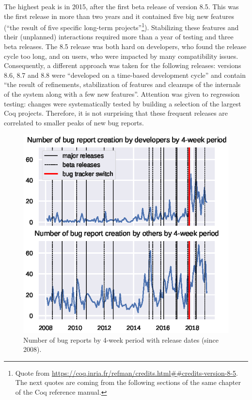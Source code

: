 \documentclass[conference]{IEEEtran}
\begin{document}
The highest peak is in 2015, after the first beta release of version 8.5. This was the first release in more than two years and it contained five big new features (``the result of five specific long-term projects''\footnote{Quote from \url{https://coq.inria.fr/refman/credits.html##credits-version-8-5}. The next quotes are coming from the following sections of the same chapter of the Coq reference manual.}). Stabilizing these features and their (unplanned) interactions required more than a year of testing and three beta releases. The 8.5 release was both hard on developers, who found the release cycle too long, and on users, who were impacted by many compatibility issues. Consequently, a different approach was taken for the following releases: versions 8.6, 8.7 and 8.8 were ``developed on a time-based development cycle'' and contain ``the result of refinements, stabilization of features and cleanups of the internals of the system along with a few new features''. Attention was given to regression testing: changes were systematically tested by building a selection of the largest Coq projects. Therefore, it is not surprising that these frequent releases are correlated to smaller peaks of new bug reports.

\begin{figure}
\includegraphics{bug_nb_with_releases.eps}
\caption{Number of bug reports by 4-week period with release dates (since 2008).} \label{bug_nb_with_releases}
\end{figure}
\end{document}
